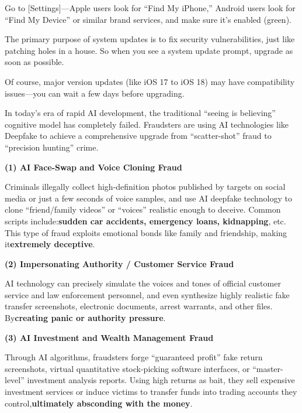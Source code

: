 Go to [Settings]—Apple users look for “Find My iPhone,” Android users look for “Find My Device” or similar brand services, and make sure it's enabled (green).


The primary purpose of system updates is to fix security vulnerabilities, just like patching holes in a house. So when you see a system update prompt, upgrade as soon as possible.

Of course, major version updates (like iOS 17 to iOS 18) may have compatibility issues—you can wait a few days before upgrading.


In today's era of rapid AI development, the traditional “seeing is believing” cognitive model has completely failed. Fraudsters are using AI technologies like Deepfake to achieve a comprehensive upgrade from “scatter-shot” fraud to “precision hunting” crime.


\textbf{(1) AI Face-Swap and Voice Cloning Fraud}\par

Criminals illegally collect high-definition photos published by targets on social media or just a few seconds of voice samples, and use AI deepfake technology to clone “friend/family videos” or “voices” realistic enough to deceive. Common scripts include:\textbf{sudden car accidents, emergency loans, kidnapping}, etc. This type of fraud exploits emotional bonds like family and friendship, making it\textbf{extremely deceptive}.

\textbf{(2) Impersonating Authority / Customer Service Fraud}\par

AI technology can precisely simulate the voices and tones of official customer service and law enforcement personnel, and even synthesize highly realistic fake transfer screenshots, electronic documents, arrest warrants, and other files. By\textbf{creating panic or authority pressure}.

\textbf{(3) AI Investment and Wealth Management Fraud}\par

Through AI algorithms, fraudsters forge “guaranteed profit” fake return screenshots, virtual quantitative stock-picking software interfaces, or “master-level” investment analysis reports. Using high returns as bait, they sell expensive investment services or induce victims to transfer funds into trading accounts they control,\textbf{ultimately absconding with the money}.

